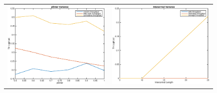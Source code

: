 \begin{figure}
\begin{tabular}{cc}

\includegraphics[scale=0.35]{../../src/fig-simulation_random_web-penter-1_0_5_0_1_1_5.eps} & \includegraphics[scale=0.35]{../../src/fig-simulation_web_download-interarival-1_1_1_5_1_1_25.eps} \\

\end{tabular}
\end{figure}
